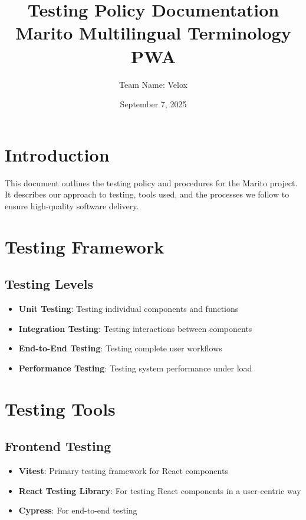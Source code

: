 \documentclass[12pt]{article}
\title{Testing Policy Documentation\\\large\textbf{Marito Multilingual Terminology PWA}}
\author{Team Name: Velox}
\date{September 7, 2025}
\begin{document}
\maketitle
\tableofcontents
\newpage

\section{Introduction}
This document outlines the testing policy and procedures for the Marito project. It describes our approach to testing, tools used, and the processes we follow to ensure high-quality software delivery.

\section{Testing Framework}

\subsection{Testing Levels}
\begin{itemize}
    \item \textbf{Unit Testing}: Testing individual components and functions
    \item \textbf{Integration Testing}: Testing interactions between components
    \item \textbf{End-to-End Testing}: Testing complete user workflows
    \item \textbf{Performance Testing}: Testing system performance under load
\end{itemize}

\section{Testing Tools}

\subsection{Frontend Testing}
\begin{itemize}
    \item \textbf{Vitest}: Primary testing framework for React components
    \item \textbf{React Testing Library}: For testing React components in a user-centric way
    \item \textbf{Cypress}: For end-to-end testing
\end{itemize}
\end{document}
